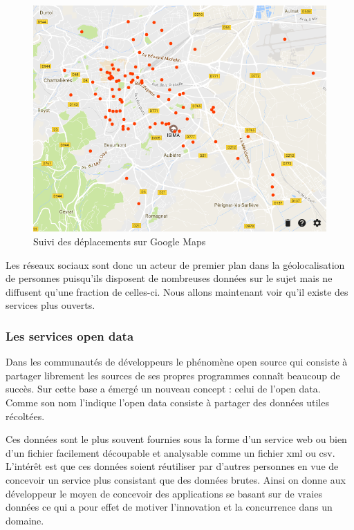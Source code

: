 \begin{figure}[H]
    \centering
    \includegraphics[width=\textwidth]{./img/googlemaps.png}
    \caption{Suivi des déplacements sur Google Maps}
    \label{google-maps}
\end{figure}

Les réseaux sociaux sont donc un acteur de premier plan dans la géolocalisation de personnes puisqu’ils disposent de nombreuses données sur le sujet mais ne diffusent qu’une fraction de celles-ci. Nous allons maintenant voir qu’il existe des services plus ouverts.

\subsubsection{Les services open data}

Dans les communautés de développeurs le phénomène open source qui consiste à partager librement les sources de ses propres programmes connaît beaucoup de succès. Sur cette base a émergé un nouveau concept : celui de l’open data. Comme son nom l’indique l’open data consiste à partager des données utiles récoltées.

Ces données sont le plus souvent fournies sous la forme d’un service web ou bien d’un fichier facilement découpable et analysable comme un fichier xml ou csv. L’intérêt est que ces données soient réutiliser par d’autres personnes en vue de concevoir un service plus consistant que des données brutes. Ainsi on donne aux développeur le moyen de concevoir des applications se basant sur de vraies données ce qui a pour effet de motiver l’innovation et la concurrence dans un domaine.

